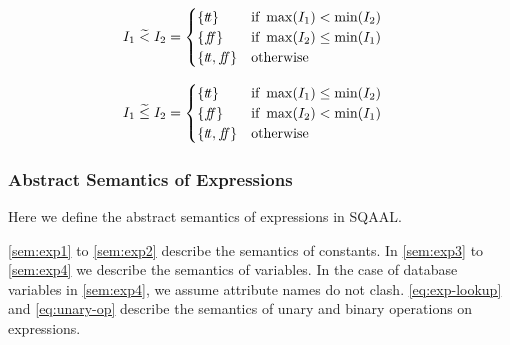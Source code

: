 \begin{align}\label{eq:aaabcomp2}
    I_1 \;\aab{<}\; I_2 &= \begin{cases}
        \{\true\} & \text{if } \max(I_1) < \min(I_2) \\
        \{\false\} & \text{if } \max(I_2) \leq \min (I_1) \\
        \{\true, \false\} & \text{otherwise}
    \end{cases}
\end{align}

\begin{align}\label{eq:aaabcomp3}
    I_1 \;\aab{\leq}\; I_2 &= \begin{cases}
        \{\true\} & \text{if } \max(I_1) \leq \min(I_2) \\
        \{\false\} & \text{if } \max(I_2) < \min (I_1) \\
        \{\true, \false\} & \text{otherwise}
    \end{cases}
\end{align}

\subsubsection{Abstract Semantics of Expressions}

Here we define the abstract semantics of expressions in SQAAL.

\autoref{sem:exp1} to \ref{sem:exp2} describe the semantics of constants.
In \autoref{sem:exp3} to \ref{sem:exp4} we describe the semantics of variables.
In the case of database variables in \autoref{sem:exp4}, we assume attribute names do not clash.
\autoref{eq:exp-lookup} and \autoref{eq:unary-op} describe the semantics of unary and binary operations on expressions.

